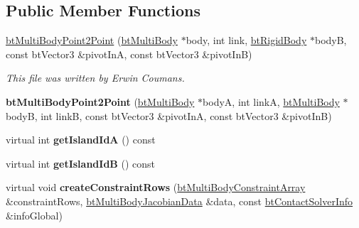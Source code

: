 \subsection*{Public Member Functions}
\begin{DoxyCompactItemize}
\item 
\mbox{\label{classbtMultiBodyPoint2Point_a0c1306efc09b87bb9d39111daf82daf5}} 
\hyperlink{classbtMultiBodyPoint2Point_a0c1306efc09b87bb9d39111daf82daf5}{bt\+Multi\+Body\+Point2\+Point} (\hyperlink{classbtMultiBody}{bt\+Multi\+Body} $\ast$body, int link, \hyperlink{classbtRigidBody}{bt\+Rigid\+Body} $\ast$bodyB, const bt\+Vector3 \&pivot\+InA, const bt\+Vector3 \&pivot\+InB)
\begin{DoxyCompactList}\small\item\em This file was written by Erwin Coumans. \end{DoxyCompactList}\item 
\mbox{\label{classbtMultiBodyPoint2Point_af7a950d153633ec5b7b41e8c91f54073}} 
{\bfseries bt\+Multi\+Body\+Point2\+Point} (\hyperlink{classbtMultiBody}{bt\+Multi\+Body} $\ast$bodyA, int linkA, \hyperlink{classbtMultiBody}{bt\+Multi\+Body} $\ast$bodyB, int linkB, const bt\+Vector3 \&pivot\+InA, const bt\+Vector3 \&pivot\+InB)
\item 
\mbox{\label{classbtMultiBodyPoint2Point_a844423653dcef4fdfb16a4e72c2edc5a}} 
virtual int {\bfseries get\+Island\+IdA} () const
\item 
\mbox{\label{classbtMultiBodyPoint2Point_a4cc7c3c4cfedba928ae6ffecc9d87e66}} 
virtual int {\bfseries get\+Island\+IdB} () const
\item 
\mbox{\label{classbtMultiBodyPoint2Point_a66c84891560b0c53bb6ec69629f5fec3}} 
virtual void {\bfseries create\+Constraint\+Rows} (\hyperlink{classbtAlignedObjectArray}{bt\+Multi\+Body\+Constraint\+Array} \&constraint\+Rows, \hyperlink{structbtMultiBodyJacobianData}{bt\+Multi\+Body\+Jacobian\+Data} \&data, const \hyperlink{structbtContactSolverInfo}{bt\+Contact\+Solver\+Info} \&info\+Global)
\item 
\mbox{\label{classbtMultiBodyPoint2Point_a00f053d579e5fd0bf2475c043fa8e0d7}} 

\end{DoxyCompactItemize}
